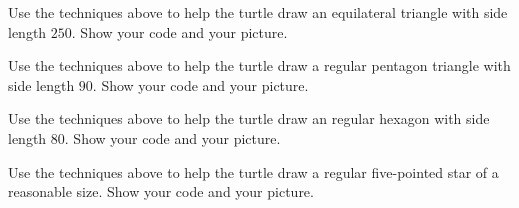 \documentclass[noauthor,nooutcomes,12pt]{ximera}
\begin{document}
\newpage

\begin{problem}
  Use the techniques above to help the turtle draw an equilateral
  triangle with side length $250$. Show your code and your picture.
\end{problem}

\newpage

\begin{problem}
  Use the techniques above to help the turtle draw a regular pentagon
  triangle with side length $90$. Show your code and your picture. 
\end{problem}

\newpage


\begin{problem}
  Use the techniques above to help the turtle draw an regular hexagon
  with side length $80$. Show your code and your picture. 
\end{problem}

\newpage

\begin{problem}
  Use the techniques above to help the turtle draw a regular
  five-pointed star of a reasonable size. Show your code and your
  picture.
\end{problem}
\end{document}
